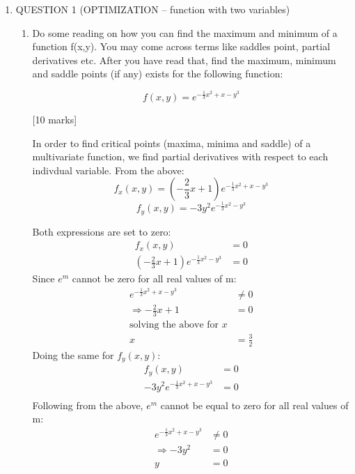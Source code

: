 \documentclass{article}
\begin{document}
	\begin{enumerate}
		\item QUESTION 1  (OPTIMIZATION – function with two variables)
		\begin{enumerate}
			\item Do some reading on how you can find the maximum and minimum of a function f(x,y). You may come across terms like saddles point, partial derivatives etc. After you have read that, find the maximum, minimum and saddle points (if any) exists for the following function:
			
			$$
			f(x, y) = e^{-\frac{1}{3}x^2 + x - y^3}
			$$
			
			\hfill[10 marks]
			
			
			In order to find critical points (maxima, minima and saddle) of a multivariate function, we find partial derivatives with respect to each indivdual variable. From the above:
			\begin{equation*}
				f_{x}(x,y) = \left(-\frac{2}{3}x + 1\right)e^{-\frac{1}{3}x^2 + x - y^3}
			\end{equation*}
			\begin{equation*}
				f_{y}(x,y) = -3y^2 e ^{-\frac{1}{3}x^2 - y^3}
			\end{equation*}
			
			Both expressions are set to zero:
			\begin{equation*}
				\begin{split}
					f_{x}(x,y) &= 0\\
					\left(-\frac{2}{3}x + 1\right)e^{-\frac{1}{3}x^2 - y^3} &= 0
				\end{split} 
			\end{equation*}
			Since $e^{m}$ cannot be zero for all real values of m:
			\begin{equation*}
				\begin{split}
					e^{-\frac{1}{3}x^2 + x - y^3} &\neq 0\\
					\Rightarrow -\frac{2}{3}x + 1 &= 0\\
					\text{solving the above for }x\\
					x &= \frac{3}{2}
				\end{split} 
			\end{equation*}
			Doing the same for $f_{y}(x,y)$:
			\begin{equation*}
				\begin{split}
					f_{y}(x,y) &= 0\\
					-3y^2 e ^{-\frac{1}{3}x^2 + x - y^3} &= 0\\
				\end{split}
			\end{equation*}
			Following from the above, $e^m$ cannot be equal to zero for all real values of m:
			\begin{equation*}
				\begin{split}
					e ^{-\frac{1}{3}x^2 + x - y^3} &\neq 0\\
					\Rightarrow -3y^2 &= 0\\
					y &= 0
				\end{split}
			\end{equation*}
			

\end{enumerate}
\end{enumerate}
\end{document}
